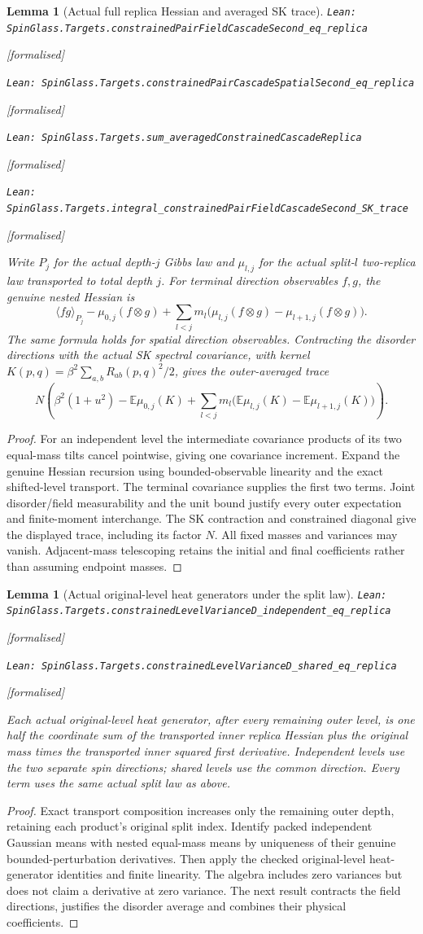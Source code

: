 \documentclass[11pt]{article}
\providecommand{\lean}[1]{\leavevmode\par\nopagebreak
  {\noindent\normalfont\footnotesize\raggedright\texttt{Lean: #1}\par}\nopagebreak}
\providecommand{\leanok}{\par\nopagebreak
  {\noindent\normalfont\footnotesize\textcolor{green!50!black}{[formalised]}\par}\nopagebreak}
\newtheorem{lemma}[theorem]{Lemma}
\newcommand{\E}{\mathbb{E}}
\begin{document}
\begin{lemma}[Actual full replica Hessian and averaged SK trace]
\lean{SpinGlass.Targets.constrainedPairFieldCascadeSecond\_eq\_replica}\leanok
\lean{SpinGlass.Targets.constrainedPairCascadeSpatialSecond\_eq\_replica}\leanok
\lean{SpinGlass.Targets.sum\_averagedConstrainedCascadeReplica}\leanok
\lean{SpinGlass.Targets.integral\_constrainedPairFieldCascadeSecond\_SK\_trace}\leanok
Write $P_j$ for the actual depth-$j$ Gibbs law and $\mu_{l,j}$ for the
actual split-$l$ two-replica law transported to total depth $j$. For terminal
direction observables $f,g$, the genuine nested Hessian is
\[
 \langle fg\rangle_{P_j}-\mu_{0,j}(f\otimes g)
 +\sum_{l<j}m_l\bigl(\mu_{l,j}(f\otimes g)-\mu_{l+1,j}(f\otimes g)\bigr).
\]
The same formula holds for spatial direction observables. Contracting the
disorder directions with the actual SK spectral covariance, with kernel
$K(p,q)=\beta^2\sum_{a,b}R_{ab}(p,q)^2/2$, gives the outer-averaged trace
\[
 N\left(\beta^2(1+u^2)-\E\mu_{0,j}(K)
 +\sum_{l<j}m_l\bigl(\E\mu_{l,j}(K)-\E\mu_{l+1,j}(K)\bigr)\right).
\]
\end{lemma}
\begin{proof}
For an independent level the intermediate covariance products of its two
equal-mass tilts cancel pointwise, giving one covariance increment.
Expand the genuine Hessian recursion using bounded-observable linearity and
the exact shifted-level transport. The terminal covariance supplies the first
two terms. Joint disorder/field measurability and the unit bound justify
every outer expectation and finite-moment interchange. The SK contraction
and constrained diagonal give the displayed trace, including its factor $N$.
All fixed masses and variances may vanish. Adjacent-mass telescoping retains
the initial and final coefficients rather than assuming endpoint masses.
\end{proof}
\begin{lemma}[Actual original-level heat generators under the split law]
\lean{SpinGlass.Targets.constrainedLevelVarianceD\_independent\_eq\_replica}\leanok
\lean{SpinGlass.Targets.constrainedLevelVarianceD\_shared\_eq\_replica}\leanok
Each actual original-level heat generator, after every remaining outer level,
is one half the coordinate sum of the transported inner replica Hessian plus
the original mass times the transported inner squared first derivative.
Independent levels use the two separate spin directions; shared levels use
the common direction. Every term uses the same actual split law as above.
\end{lemma}
\begin{proof}
Exact transport composition increases only the remaining outer depth, retaining
each product's original split index. Identify packed independent Gaussian means
with nested equal-mass means by uniqueness of their genuine bounded-perturbation
derivatives. Then apply the checked original-level heat-generator identities
and finite linearity. The algebra includes zero variances but does not claim
a derivative at zero variance. The next result contracts the field directions,
justifies the disorder average and combines their physical coefficients.
\end{proof}
\end{document}
